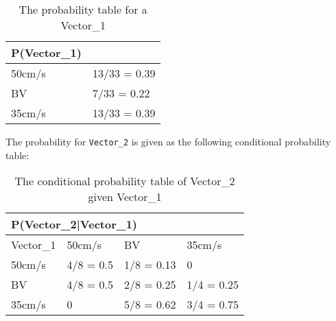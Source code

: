 \begin{center}
\begin{table}[H]
\begin{tabular}{|l|l|}
\hline
P(Vector\_1) &\\ \hline
50cm/s & 13/33 = 0.39   \\ \hline
BV & 7/33 = 0.22  \\ \hline
35cm/s & 13/33 = 0.39  \\ \hline
\end{tabular}
\caption{The probability table for a Vector\_1}
\label{Vector0Table}
\end{table}
\end{center}

The probability for \texttt{Vector\_2} is given as the following conditional
probability table:
\begin{table}[]
\centering
\begin{tabular}{|l|l|l|l|}
\hline
\multicolumn{4}{|l|}{P(Vector\_2|Vector\_1)} \\ \hline
 Vector\_1 & 50cm/s    & BV    & 35cm/s    \\ \hline
 50cm/s    & 4/8 = 0.5    & 1/8 = 0.13    & 0    \\ \hline
 BV   & 4/8 = 0.5    & 2/8 = 0.25    & 1/4 = 0.25  \\ \hline
 35cm/s    & 0            & 5/8 = 0.62    & 3/4 = 0.75  \\ \hline
\end{tabular}
\caption{The conditional probability table of Vector\_2 given Vector\_1}
\label{vector2tab}
\end{table}
